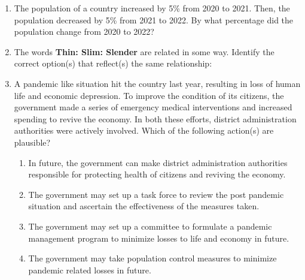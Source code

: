 \documentclass[12pt]{article}
\theoremstyle{remark}
\begin{document}
\begin{enumerate}
\hfill{}
\item The population of a country increased by 5\% from 2020 to 2021. Then, the population decreased by 5\% from 2021 to 2022. By what percentage did the population change from 2020 to 2022?
\begin{enumerate}  \end{enumerate}
\hfill{}
\item The words \textbf{Thin: Slim: Slender} are related in some way. Identify the correct option(s) that reflect(s) the same relationship: 
\begin{enumerate}  \end{enumerate}
\hfill{}
\item A pandemic like situation hit the country last year, resulting in loss of human life and economic depression. To improve the condition of its citizens, the government made a series of emergency medical interventions and increased spending to revive the economy. In both these efforts, district administration authorities were actively involved. Which of the following action(s) are plausible?
\begin{enumerate}
\item In future, the government can make district administration authorities responsible for protecting health of citizens and reviving the economy.
\item The government may set up a task force to review the post pandemic situation and ascertain the effectiveness of the measures taken.
\item The government may set up a committee to formulate a pandemic management program to minimize losses to life and economy in future.
\item The government may take population control measures to minimize pandemic related losses in future.

\end{enumerate}
\end{enumerate}
\end{document}
